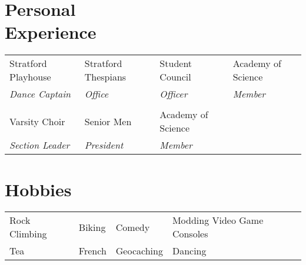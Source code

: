 \documentclass[margin,line]{res}
\begin{document}
{\begin{resume}
          {\color{WildStrawberry}
          \section{\sc Personal \\ Experience}}
          \color{black}
          \hspace{-.13in}
          \begin{tabular}{l l l l}
            Stratford Playhouse & Stratford Thespians & Student Council & Academy of Science \\
            {\em Dance Captain} & {\em Office}        & {\em Officer}   & {\em Member}\\
                                &                     &                                     & \\
                  Varsity Choir & Senior Men          & Academy of Science & \\
           {\em Section Leader} & {\em President}     & {\em Member}       & \\
          \end{tabular}

          {\color{WildStrawberry}
          \section{\sc Hobbies}}
          \color{black}
          \hspace{-.13in}
          \begin{tabular}{l l l l}
            Rock Climbing & Biking & Comedy & Modding Video Game Consoles \\
                      Tea & French & Geocaching & Dancing \\
          \end{tabular}

          {\color{WildStrawberry}
            \vspace{-.13in}
}
\end{resume}}
\end{document}
